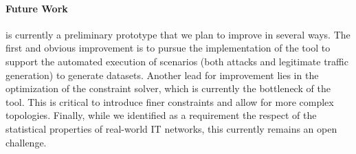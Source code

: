 \paragraph{Future Work}
\thecontrib is currently a preliminary prototype that we plan to improve in several ways.
The first and obvious improvement is to pursue the implementation of the tool to support the automated execution of scenarios (both attacks and legitimate traffic generation) to generate datasets.
Another lead for improvement lies in the optimization of the constraint solver, which is currently the bottleneck of the tool.
This is critical to introduce finer constraints and allow for more complex topologies.
Finally, while we identified as a requirement the respect of the statistical properties of real-world IT networks, this currently remains an open challenge.
